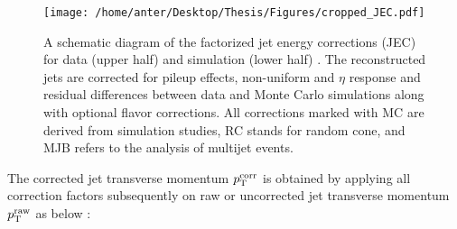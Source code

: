 \begin{figure}[!h]
 \begin{center}
 \vspace*{4mm} 
 \texttt{[image: /home/anter/Desktop/Thesis/Figures/cropped\_JEC.pdf]}\\
 \vspace*{5mm}
 \caption[A schematic diagram of the factorized jet energy corrections (JEC).]{A schematic diagram of the factorized jet energy corrections (JEC) for data (upper half) and simulation (lower half) \cite{Khachatryan:2016kdb}. The reconstructed jets are corrected for pileup effects, non-uniform \pt and $\eta$ response and residual differences between data and Monte Carlo simulations along with optional flavor corrections. All corrections marked with MC are derived from simulation studies, RC stands for random cone, and MJB refers to the analysis of multijet events.}
 \label{fig:jec}
 \end{center}
\end{figure}

The corrected jet transverse momentum $p^{\rm corr}_{\rm T}$ is obtained by applying all correction factors subsequently on raw or uncorrected jet transverse momentum $p^{\rm raw}_{\rm T}$ as below :

